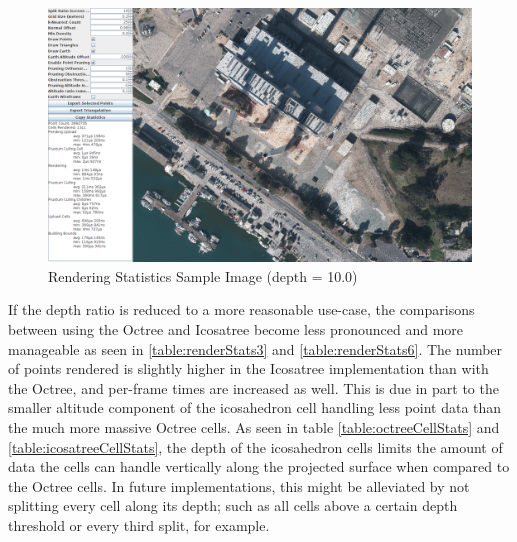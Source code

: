 \begin{figure}[htp]
\begin{center}
  \includegraphics[width=6.0in]{images/rendering10.png}
  \caption{Rendering Statistics Sample Image (depth = 10.0)}
  \label{fig:rendering10}
\end{center}
\end{figure}

If the depth ratio is reduced to a more reasonable use-case, the comparisons
between using the Octree and Icosatree become less pronounced and more
manageable as seen in \ref{table:renderStats3} and \ref{table:renderStats6}. The
number of points rendered is slightly higher in the Icosatree implementation
than with the Octree, and per-frame times are increased as well. This is due in
part to the smaller altitude component of the icosahedron cell handling less
point data than the much more massive Octree cells. As seen in table
\ref{table:octreeCellStats} and \ref{table:icosatreeCellStats}, the depth of the
icosahedron cells limits the amount of data the cells can handle vertically
along the projected surface when compared to the Octree cells. In future
implementations, this might be alleviated by not splitting every cell along its
depth; such as all cells above a certain depth threshold or every third split,
for example.

\begin{table}[htp]
\caption{Rendering Statistics}
\label{table:renderStats3}
\end{table}

